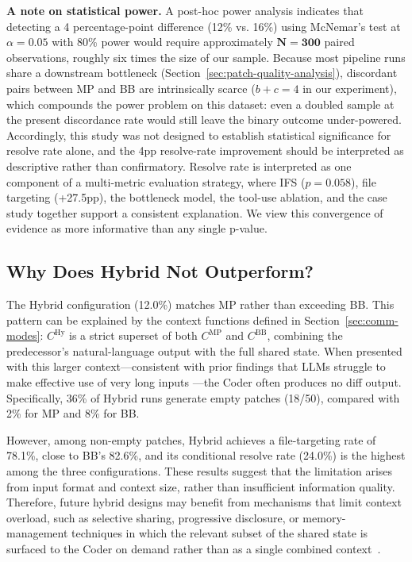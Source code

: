 \documentclass{ieeeaccess}
\begin{document}
\textbf{A note on statistical power.} A post-hoc power analysis indicates that detecting a 4 percentage-point difference (12\% vs. 16\%) using McNemar's test at $\alpha = 0.05$ with 80\% power would require approximately $\mathbf{N = 300}$ paired observations, roughly six times the size of our sample. Because most pipeline runs share a downstream bottleneck (Section~\ref{sec:patch-quality-analysis}), discordant pairs between MP and BB are intrinsically scarce ($b + c = 4$ in our experiment), which compounds the power problem on this dataset: even a doubled sample at the present discordance rate would still leave the binary outcome under-powered. Accordingly, this study was not designed to establish statistical significance for resolve rate alone, and the 4pp resolve-rate improvement should be interpreted as descriptive rather than confirmatory. Resolve rate is interpreted as one component of a multi-metric evaluation strategy, where IFS ($p = 0.058$), file targeting (+27.5pp), the bottleneck model, the tool-use ablation, and the case study together support a consistent explanation. We view this convergence of evidence as more informative than any single p-value.

\subsection{Why Does Hybrid Not Outperform?}

The Hybrid configuration (12.0\%) matches MP rather than exceeding BB. This pattern can be explained by the context functions defined in Section~\ref{sec:comm-modes}: $C^{\text{Hy}}$ is a strict superset of both $C^{\text{MP}}$ and $C^{\text{BB}}$, combining the predecessor's natural-language output with the full shared state. When presented with this larger context---consistent with prior findings that LLMs struggle to make effective use of very long inputs \cite{liu2024lost}---the Coder often produces no diff output. Specifically, 36\% of Hybrid runs generate empty patches (18/50), compared with 2\% for MP and 8\% for BB.

However, among non-empty patches, Hybrid achieves a file-targeting rate of 78.1\%, close to BB's 82.6\%, and its conditional resolve rate (24.0\%) is the highest among the three configurations. These results suggest that the limitation arises from input format and context size, rather than insufficient information quality. Therefore, future hybrid designs may benefit from mechanisms that limit context overload, such as selective sharing, progressive disclosure, or memory-management techniques in which the relevant subset of the shared state is surfaced to the Coder on demand rather than as a single combined context~\cite{zhong2024memorybank}.
\end{document}
